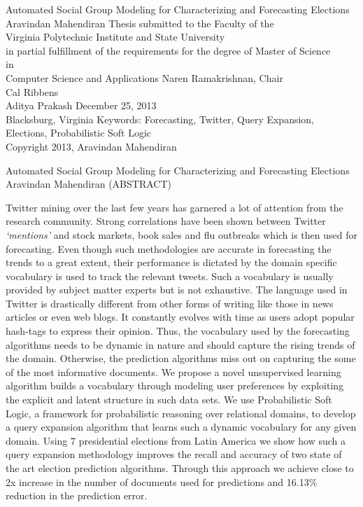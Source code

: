 \documentclass[12pt]{report}
\begin{document}
\thispagestyle{empty}

\begin{center}
{\Large 
Automated Social Group Modeling for Characterizing and Forecasting Elections
}
\vfill
Aravindan Mahendiran
\vfill
Thesis submitted to the Faculty of the \\
Virginia Polytechnic Institute and State University \\
in partial fulfillment of the requirements for the degree of
\vfill
Master of Science \\
in \\
Computer Science and Applications
\vfill
Naren Ramakrishnan, Chair \\
Cal Ribbens \\
Aditya Prakash
\vfill
December 25, 2013 \\
Blacksburg, Virginia
\vfill
Keywords: Forecasting, Twitter, Query Expansion, Elections, Probabilistic Soft Logic \\
Copyright 2013, Aravindan Mahendiran
\end{center}
\pagebreak
\thispagestyle{empty}

\begin{center}
{\large Automated Social Group Modeling for Characterizing and Forecasting Elections}
\vfill
Aravindan Mahendiran
\vfill
(ABSTRACT)
\vfill
\end{center}
Twitter mining over the last few years has garnered a lot of attention from the research community. 
Strong correlations have been shown between Twitter \emph{‘mentions’} and stock markets, book sales and flu outbreaks which is then used for forecasting.
Even though such methodologies are accurate in forecasting the trends to a great extent, their performance is dictated by the domain specific vocabulary is used to track the relevant tweets. 
Such a vocabulary is usually provided by subject matter experts but is not exhaustive.
The language used in Twitter is drastically different from other forms of writing like those in news articles or even web blogs.  
It constantly evolves with time as users adopt popular hash-tags to express their opinion.
Thus, the vocabulary used by the forecasting algorithms needs to be dynamic in nature and should capture the rising trends of the domain. 
Otherwise, the prediction algorithms miss out on capturing the some of the most informative documents.
\newline 
We propose a novel unsupervised learning algorithm builds a vocabulary through modeling user preferences by exploiting the explicit and latent structure in such data sets.
We use Probabilistic Soft Logic, a framework for probabilistic reasoning over relational domains, to develop a query expansion algorithm that learns such a dynamic vocabulary for any given domain.  
Using 7 presidential elections from Latin America we show how such a query expansion methodology improves the recall and accuracy of two state of the art election prediction algorithms. 
Through this approach we achieve close to 2x increase in the number of documents used for predictions and 16.13\% reduction in the prediction error. 
\pagebreak
\end{document}
